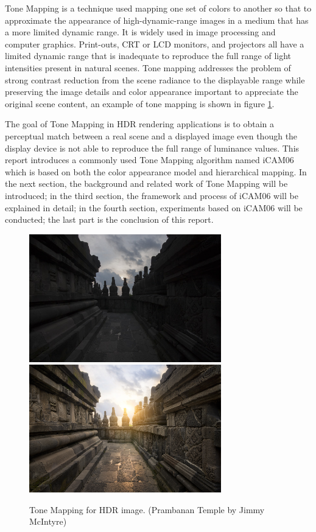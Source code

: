 \documentclass[10pt,twocolumn,letterpaper]{article}
\begin{document}
Tone Mapping is a technique used mapping one set of colors to another so that to approximate the appearance of high-dynamic-range images in a medium that has a more limited dynamic range. It is widely used in image processing and computer graphics. Print-outs, CRT or LCD monitors, and projectors all have a limited dynamic range that is inadequate to reproduce the full range of light intensities present in natural scenes. Tone mapping addresses the problem of strong contrast reduction from the scene radiance to the displayable range while preserving the image details and color appearance important to appreciate the original scene content, an example of tone mapping is shown in figure \ref{tone mapping}.

The goal of Tone Mapping in HDR rendering applications is to obtain a perceptual match between a real scene and a displayed image even though the display device is not able to reproduce the full range of luminance values. This report introduces a commonly used Tone Mapping algorithm named iCAM06 which is based on both the color appearance model and hierarchical mapping\cite{krawczyk2005lightness}. In the next section, the background and related work of Tone Mapping will be introduced; in the third section, the framework and process of iCAM06 will be 
explained in detail; in the fourth section, experiments based on iCAM06 will be conducted; the last part is the conclusion of this report.

\begin{figure}[!t]
\begin{center}
\includegraphics[height=15em]{images/original_HDRimage.jpg}
\includegraphics[height=15em]{images/toned_image.jpg}
\end{center}
   \caption{Tone Mapping for HDR image. (Prambanan Temple by Jimmy McIntyre)}
\label{tone mapping}
\end{figure}
\end{document}
